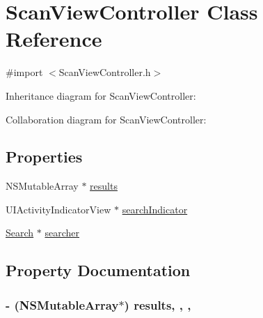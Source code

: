 \hypertarget{interface_scan_view_controller}{}\section{Scan\+View\+Controller Class Reference}
\label{interface_scan_view_controller}


{\ttfamily \#import $<$Scan\+View\+Controller.\+h$>$}



Inheritance diagram for Scan\+View\+Controller\+:


Collaboration diagram for Scan\+View\+Controller\+:
\subsection*{Properties}
\begin{DoxyCompactItemize}
\item 
N\+S\+Mutable\+Array $\ast$ \hyperlink{interface_scan_view_controller_a13f6278d7cba6cb1638f35ffc97aa10c}{results}
\item 
U\+I\+Activity\+Indicator\+View $\ast$ \hyperlink{interface_scan_view_controller_ada67b8724fa93138bd3839cfa6c8218a}{search\+Indicator}
\item 
\hyperlink{interface_search}{Search} $\ast$ \hyperlink{interface_scan_view_controller_afb27be43e63ee6a97de8e10b264ca9ad}{searcher}
\end{DoxyCompactItemize}


\subsection{Property Documentation}
\hypertarget{interface_scan_view_controller_a13f6278d7cba6cb1638f35ffc97aa10c}{}
\subsubsection[{results}]{\setlength{\rightskip}{0pt plus 5cm}-\/ (N\+S\+Mutable\+Array$\ast$) results\hspace{0.3cm}{\ttfamily [read]}, {\ttfamily [write]}, {\ttfamily [atomic]}, {\ttfamily [strong]}}\label{interface_scan_view_controller_a13f6278d7cba6cb1638f35ffc97aa10c}
\hypertarget{interface_scan_view_controller_afb27be43e63ee6a97de8e10b264ca9ad}{}
